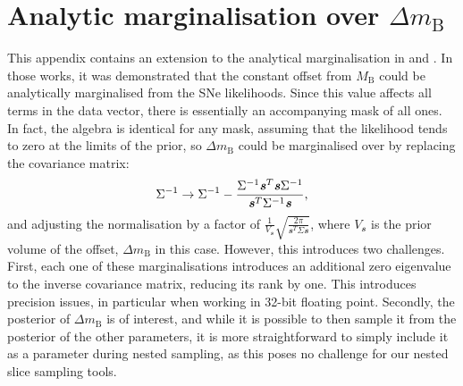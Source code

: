 \documentclass[fleqn,usenatbib]{mnras}
\newcommand{\dmb}{\ensuremath{\Delta m_\mathrm B}}
\begin{document}


    





    \appendix

    \section{Analytic marginalisation over \dmb{}}\label{apx:marginalisation}

    This appendix contains an extension to the analytical marginalisation in \cite{paper1} and \cite{paper2}.
    In those works, it was demonstrated that the constant offset from $M_\mathrm B$ could be analytically marginalised from the SNe likelihoods.
    Since this value affects all terms in the data vector, there is essentially an accompanying mask of all ones.
    In fact, the algebra is identical for any mask, assuming that the likelihood tends to zero at the limits of the prior, so \dmb{} could be marginalised over by replacing the covariance matrix:
    \begin{equation}
        \Sigma^{-1} \rightarrow \Sigma^{-1} - \frac{\Sigma^{-1} \textbf{\textit{s}}^T\textbf{\textit{s}}\Sigma^{-1}}{\textbf{\textit{s}}^T\Sigma^{-1}\textbf{\textit{s}}} \text,
    \end{equation}
    and adjusting the normalisation by a factor of $\frac 1 {V_\mathbfit s}\sqrt{\frac{2\pi}{\mathbfit s^T\Sigma\mathbfit s}}$, where $V_\mathbfit s$ is the prior volume of the offset, \dmb{} in this case.
    However, this introduces two challenges.
    First, each one of these marginalisations introduces an additional zero eigenvalue to the inverse covariance matrix, reducing its rank by one.
    This introduces precision issues, in particular when working in 32-bit floating point.
    Secondly, the posterior of \dmb{} is of interest, and while it is possible to then sample it from the posterior of the other parameters, it is more straightforward to simply include it as a parameter during nested sampling, as this poses no challenge for our nested slice sampling tools.
\end{document}
